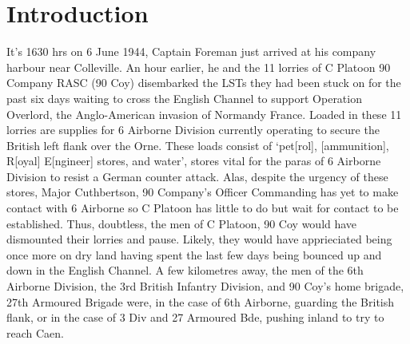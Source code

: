 \documentclass[noraggedright]{turabian-researchpaper}
\title{}
\subtitle{}
\date{\today} %
\author{}
\begin{document}
\maketitle

\section{Introduction}



It's 1630 hrs on 6 June 1944, Captain Foreman just arrived at his company 
harbour near Colleville.  An hour earlier, he and the 11 lorries of C Platoon
90 Company RASC (90 Coy) disembarked the LSTs they had been stuck on for the 
past six days waiting to cross the English Channel to support Operation 
Overlord, the Anglo-American invasion of Normandy France.  Loaded in these 
11 lorries are supplies for 6 Airborne Division currently operating to secure 
the British left flank over the Orne.  These loads consist of `pet[rol], 
[ammunition], R[oyal] E[ngineer] stores, and water', stores vital for the 
paras of 6 Airborne Division to resist a German counter 
attack.\autocite[S \& T Report (June History Report) p 4]{90wd} 
Alas, despite the urgency of these stores, Major Cuthbertson, 90 Company's 
Officer Commanding has yet to make contact with 6 Airborne so C Platoon has 
little to do but wait for contact to be 
established.\autocite[6 June 1944]{90wd}
Thus, doubtless, the men of C Platoon, 90 Coy would have dismounted their 
lorries and pause.  Likely, they would have apprieciated being once more
on dry land having spent the last few days being bounced up and down in the
English Channel.  A few kilometres away, the men of the 6th Airborne Division,
the 3rd British Infantry Division, and 90 Coy's home brigade, 27th Armoured
Brigade were, in the case of 6th Airborne, guarding the British flank, or
in the case of 3 Div and 27 Armoured Bde, pushing inland to try to reach
Caen.
\end{document}

